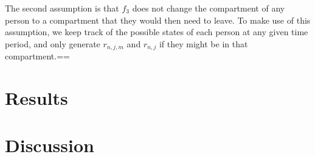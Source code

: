 \documentclass{article}
\begin{document}
The second assumption is that $f_3$ does not change the compartment of any person to a compartment that they would then need to leave.  To make use of this assumption, we keep track of the possible states of each person at any given time  period, and only generate $r_{n,j,m}$ and $r_{n,j}$ if they might be in that compartment.==
\section{Results}
\section{Discussion}

{}

\end{document}
